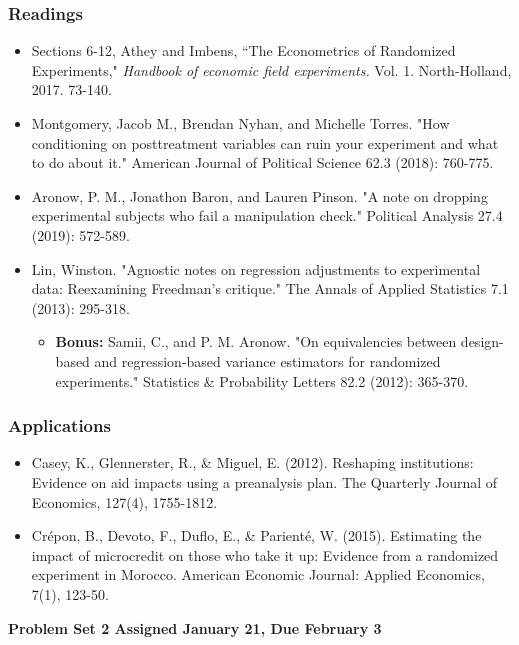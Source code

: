 \documentclass[11pt, article, oneside]{memoir}
\theoremstyle{Assumption}
\begin{document}
\subsubsection*{Readings}

\begin{itemize}
\item Sections 6-12, Athey and Imbens, ``The Econometrics of Randomized Experiments,"  \textit{Handbook of economic field experiments.} Vol. 1. North-Holland, 2017. 73-140. 
\item Montgomery, Jacob M., Brendan Nyhan, and Michelle Torres. "How conditioning on posttreatment variables can ruin your experiment and what to do about it." American Journal of Political Science 62.3 (2018): 760-775.
\item Aronow, P. M., Jonathon Baron, and Lauren Pinson. "A note on dropping experimental subjects who fail a manipulation check." Political Analysis 27.4 (2019): 572-589.
\item Lin, Winston. "Agnostic notes on regression adjustments to experimental data: Reexamining Freedman’s critique." The Annals of Applied Statistics 7.1 (2013): 295-318.
\begin{itemize}
\item \textbf{Bonus:} Samii, C., and P. M. Aronow. "On equivalencies between design-based and regression-based variance estimators for randomized experiments." Statistics \& Probability Letters 82.2 (2012): 365-370.
\end{itemize}

\end{itemize}

\subsubsection*{Applications}

\begin{itemize}
\item Casey, K., Glennerster, R., \& Miguel, E. (2012). Reshaping institutions: Evidence on aid impacts using a preanalysis plan. The Quarterly Journal of Economics, 127(4), 1755-1812.
\item Crépon, B., Devoto, F., Duflo, E., \& Parienté, W. (2015). Estimating the impact of microcredit on those who take it up: Evidence from a randomized experiment in Morocco. American Economic Journal: Applied Economics, 7(1), 123-50.
\end{itemize}


\textbf{Problem Set 2 Assigned January 21, Due February 3}
\end{document}
